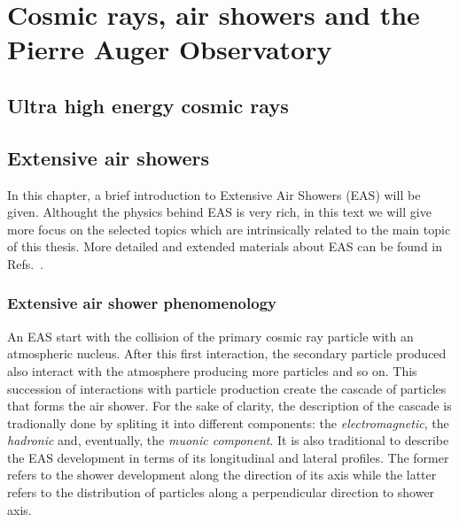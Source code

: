 \chapter{Cosmic rays, air showers and the Pierre Auger Observatory}
\label{sec:uhecr}


\section{Ultra high energy cosmic rays}

\section{Extensive air showers}


In this chapter, a brief introduction to Extensive Air Showers (EAS)
will be given. Althought the physics behind EAS is very rich,
in this text we will give more focus on the selected topics
which are intrinsically related to the main topic of this thesis.
More detailed and extended materials about EAS can be found
in Refs.~\cite{GaisserBook,GriederBook}.


\subsection{Extensive air shower phenomenology}
\label{sec:showers:phen}

An EAS start with the collision of the primary cosmic ray particle
with an atmospheric nucleus. After this first interaction, the secondary
particle produced also interact with the atmosphere producing more
particles and so on. This succession of interactions with particle production
create the cascade of particles that forms the air shower.
For the sake of clarity, the description of the cascade is tradionally
done by spliting it into different components: the \emph{electromagnetic},
the \emph{hadronic} and, eventually, the \emph{muonic component}. It is also traditional
to describe the EAS development in terms of its longitudinal and lateral profiles.
The former refers to the shower development along the direction of its axis
while the latter refers to the distribution of particles
along a perpendicular direction to shower axis.


